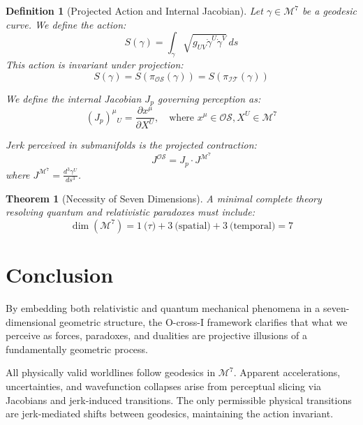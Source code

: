 \documentclass{article}
\newtheorem{definition}{Definition}
\newtheorem{theorem}{Theorem}
\begin{document}
\begin{definition}[Projected Action and Internal Jacobian]
Let \( \gamma \in \mathcal{M}^7 \) be a geodesic curve. We define the action:
\begin{equation}
S(\gamma) = \int_\gamma \sqrt{g_{UV} \dot{\gamma}^U \dot{\gamma}^V} \, ds
\end{equation}
This action is invariant under projection:
\begin{equation}
S(\gamma) = S(\pi_{\mathcal{OS}}(\gamma)) = S(\pi_{\mathcal{IT}}(\gamma))
\end{equation}

We define the internal Jacobian \( J_p \) governing perception as:
\begin{equation}
(J_p)^\mu{}_U = \frac{\partial x^\mu}{\partial X^U}, \quad \text{where } x^\mu \in \mathcal{OS}, X^U \in \mathcal{M}^7
\end{equation}

Jerk perceived in submanifolds is the projected contraction:
\begin{equation}
J^{\mathcal{OS}} = J_p \cdot J^{\mathcal{M}^7}
\end{equation}
where \( J^{\mathcal{M}^7} = \frac{d^3 \gamma^U}{ds^3} \).
\end{definition}

\begin{theorem}[Necessity of Seven Dimensions]
A minimal complete theory resolving quantum and relativistic paradoxes must include:
\begin{equation}
\dim(\mathcal{M}^7) = 1\ \text{(}\tau\text{)} + 3\ \text{(spatial)} + 3\ \text{(temporal)} = 7
\end{equation}
\end{theorem}

\section{Conclusion}

By embedding both relativistic and quantum mechanical phenomena in a seven-dimensional geometric structure, the O-cross-I framework clarifies that what we perceive as forces, paradoxes, and dualities are projective illusions of a fundamentally geometric process.

All physically valid worldlines follow geodesics in \( \mathcal{M}^7 \). Apparent accelerations, uncertainties, and wavefunction collapses arise from perceptual slicing via Jacobians and jerk-induced transitions. The only permissible physical transitions are jerk-mediated shifts between geodesics, maintaining the action invariant. 
\end{document}

